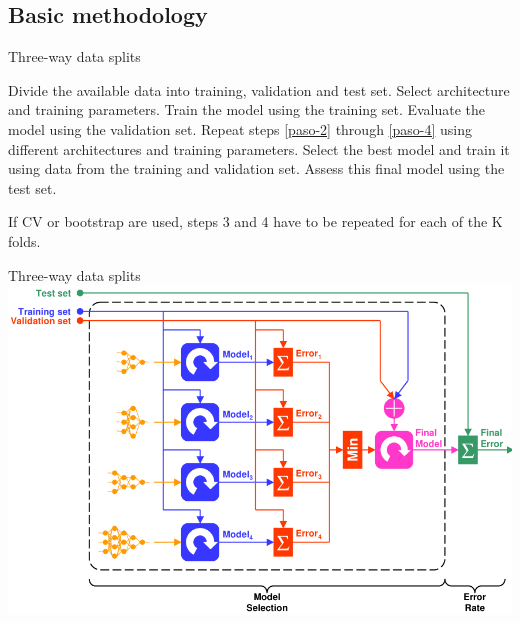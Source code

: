 \documentclass[aspectratio=169,compress,10pt]{beamer}
\begin{document}
\subsection{Basic methodology}
\begin{frame}{Three-way data splits}
\centering{}
\begin{algorithmic}[1] 
\STATE Divide the available data into training, validation and test set.
\STATE Select architecture and training parameters. \label{paso-2}
\STATE Train the model using the training set.
\STATE Evaluate the model using the validation set. \label{paso-4}
\STATE Repeat steps \ref{paso-2} through \ref{paso-4} using different architectures and training parameters.
\STATE Select the best model and train it using data from the training and validation set.
\STATE Assess this final model using the test set.
\end{algorithmic} 

If CV or bootstrap are used, steps 3 and 4 have to be repeated for each of the K folds.

\end{frame}

\begin{frame}{Three-way data splits}
\centering
\includegraphics[width=.7\textwidth]{../report/resources/images/full-validation}
\end{frame}
\end{document}
